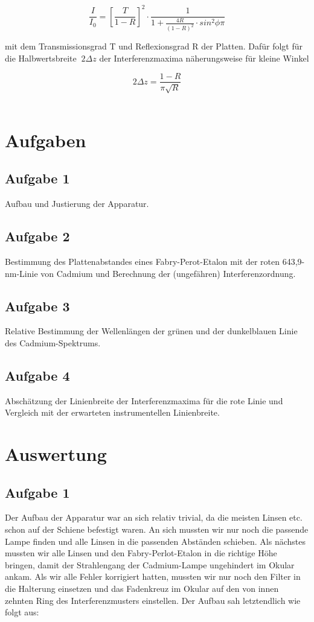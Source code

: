 \documentclass{article}
\begin{document}
\begin{equation}
\label{10}
\frac {I}{I_{0}} = \left [ \frac {T}{1-R} \right ]^2 \cdot \frac {1}{1+ \frac {4R}{(1-R)^2} \cdot sin^2 \phi \pi}
\end{equation}

mit dem Transmissionsgrad T und Reflexionsgrad R der Platten. Dafür folgt für die Halbwertsbreite \(\ 2 \Delta z \) der Interferenzmaxima näherungsweise für kleine Winkel

\begin{equation}
\label{11}
2 \Delta z= \frac {1-R}{\pi \sqrt {R}}
\end{equation}\\

\section{Aufgaben}
\subsection{Aufgabe 1}
Aufbau und Justierung der Apparatur.
\subsection{Aufgabe 2}
Bestimmung des Plattenabstandes eines {\sc  Fabry-Perot-Etalon} mit der roten 643,9-nm-Linie von Cadmium und Berechnung der (ungefähren) Interferenzordnung.
\subsection{Aufgabe 3}
Relative Bestimmung der Wellenlängen der grünen und der dunkelblauen Linie des Cadmium-Spektrums.
\subsection{Aufgabe 4}
Abschätzung der Linienbreite der Interferenzmaxima für die rote Linie und Vergleich mit der erwarteten instrumentellen Linienbreite.

\newpage

\section{Auswertung}
\subsection{Aufgabe 1}
Der Aufbau der Apparatur war an sich relativ trivial, da die meisten Linsen etc. schon auf der Schiene befestigt waren. An sich mussten wir nur noch die passende Lampe finden und alle Linsen in die passenden Abständen schieben. Als nächstes mussten wir alle Linsen und den Fabry-Perlot-Etalon in die richtige Höhe bringen, damit der Strahlengang der Cadmium-Lampe ungehindert im Okular ankam. Als wir alle Fehler korrigiert hatten, mussten wir nur noch den Filter in die Halterung einsetzen und das Fadenkreuz im Okular auf den von innen zehnten Ring des Interferenzmusters einstellen.
Der Aufbau sah letztendlich wie folgt aus:
\end{document}
